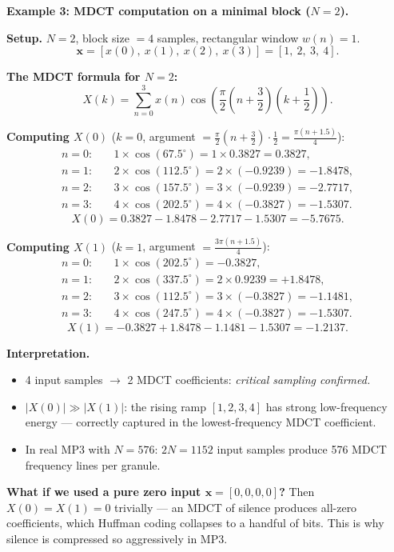 \begin{examplebox}
\textbf{Example 3: MDCT computation on a minimal block ($N=2$).}

\medskip
\noindent\textbf{Setup.} $N = 2$, block size $= 4$ samples, rectangular window $w(n) = 1$.
\[
\mathbf{x} = [x(0),\ x(1),\ x(2),\ x(3)] = [1,\ 2,\ 3,\ 4].
\]

\medskip
\noindent\textbf{The MDCT formula for $N=2$:}
\[
X(k) = \sum_{n=0}^{3} x(n)\cos\!\left(\frac{\pi}{2}\left(n + \frac{3}{2}\right)\left(k + \frac{1}{2}\right)\right).
\]

\medskip
\noindent\textbf{Computing $X(0)$} ($k = 0$, argument $= \frac{\pi}{2}(n+\frac{3}{2})\cdot\frac{1}{2} = \frac{\pi(n+1.5)}{4}$):
\begin{align*}
n=0: &\quad 1 \times \cos(67.5^\circ) = 1 \times 0.3827 = 0.3827, \\
n=1: &\quad 2 \times \cos(112.5^\circ) = 2 \times (-0.9239) = -1.8478, \\
n=2: &\quad 3 \times \cos(157.5^\circ) = 3 \times (-0.9239) = -2.7717, \\
n=3: &\quad 4 \times \cos(202.5^\circ) = 4 \times (-0.3827) = -1.5307.
\end{align*}
\[
X(0) = 0.3827 - 1.8478 - 2.7717 - 1.5307 = \mathbf{-5.7675}.
\]

\medskip
\noindent\textbf{Computing $X(1)$} ($k = 1$, argument $= \frac{3\pi(n+1.5)}{4}$):
\begin{align*}
n=0: &\quad 1 \times \cos(202.5^\circ) = -0.3827, \\
n=1: &\quad 2 \times \cos(337.5^\circ) = 2 \times 0.9239 = +1.8478, \\
n=2: &\quad 3 \times \cos(112.5^\circ) = 3 \times (-0.3827) = -1.1481, \\
n=3: &\quad 4 \times \cos(247.5^\circ) = 4 \times (-0.3827) = -1.5307.
\end{align*}
\[
X(1) = -0.3827 + 1.8478 - 1.1481 - 1.5307 = \mathbf{-1.2137}.
\]

\medskip
\noindent\textbf{Interpretation.}
\begin{itemize}[nosep]
  \item 4 input samples $\to$ 2 MDCT coefficients: \emph{critical sampling confirmed.}
  \item $|X(0)| \gg |X(1)|$: the rising ramp $[1,2,3,4]$ has strong low-frequency energy --- correctly captured in the lowest-frequency MDCT coefficient.
  \item In real MP3 with $N = 576$: $2N = 1152$ input samples produce 576 MDCT frequency lines per granule.
\end{itemize}

\medskip
\noindent\textbf{What if we used a pure zero input $\mathbf{x} = [0,0,0,0]$?}
Then $X(0) = X(1) = 0$ trivially --- an MDCT of silence produces all-zero coefficients, which Huffman coding collapses to a handful of bits. This is why silence is compressed so aggressively in MP3.
\end{examplebox}

